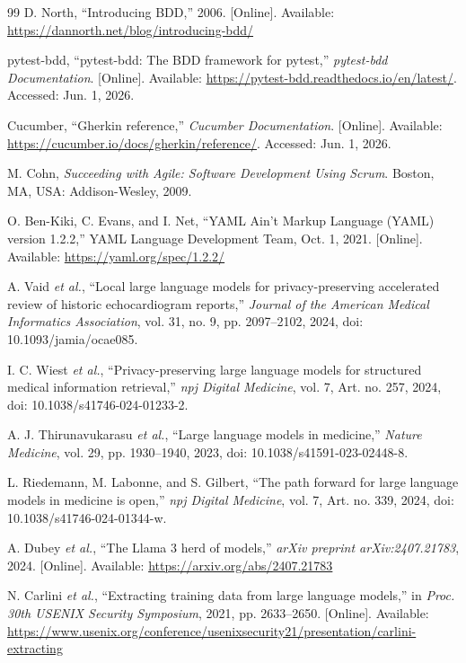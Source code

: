 \begin{thebibliography}{99}
D. North, ``Introducing BDD,'' 2006. [Online]. Available: \url{https://dannorth.net/blog/introducing-bdd/}

pytest-bdd, ``pytest-bdd: The BDD framework for pytest,'' \textit{pytest-bdd Documentation}. [Online]. Available: \url{https://pytest-bdd.readthedocs.io/en/latest/}. Accessed: Jun. 1, 2026.

Cucumber, ``Gherkin reference,'' \textit{Cucumber Documentation}. [Online]. Available: \url{https://cucumber.io/docs/gherkin/reference/}. Accessed: Jun. 1, 2026.

M. Cohn, \textit{Succeeding with Agile: Software Development Using Scrum}. Boston, MA, USA: Addison-Wesley, 2009.

O. Ben-Kiki, C. Evans, and I. Net, ``YAML Ain't Markup Language (YAML) version 1.2.2,'' YAML Language Development Team, Oct. 1, 2021. [Online]. Available: \url{https://yaml.org/spec/1.2.2/}

A. Vaid \textit{et al.}, ``Local large language models for privacy-preserving accelerated review of historic echocardiogram reports,'' \textit{Journal of the American Medical Informatics Association}, vol. 31, no. 9, pp. 2097--2102, 2024, doi: 10.1093/jamia/ocae085.

I. C. Wiest \textit{et al.}, ``Privacy-preserving large language models for structured medical information retrieval,'' \textit{npj Digital Medicine}, vol. 7, Art. no. 257, 2024, doi: 10.1038/s41746-024-01233-2.

A. J. Thirunavukarasu \textit{et al.}, ``Large language models in medicine,'' \textit{Nature Medicine}, vol. 29, pp. 1930--1940, 2023, doi: 10.1038/s41591-023-02448-8.

L. Riedemann, M. Labonne, and S. Gilbert, ``The path forward for large language models in medicine is open,'' \textit{npj Digital Medicine}, vol. 7, Art. no. 339, 2024, doi: 10.1038/s41746-024-01344-w.

A. Dubey \textit{et al.}, ``The Llama 3 herd of models,'' \textit{arXiv preprint arXiv:2407.21783}, 2024. [Online]. Available: \url{https://arxiv.org/abs/2407.21783}

N. Carlini \textit{et al.}, ``Extracting training data from large language models,'' in \textit{Proc. 30th USENIX Security Symposium}, 2021, pp. 2633--2650. [Online]. Available: \url{https://www.usenix.org/conference/usenixsecurity21/presentation/carlini-extracting}

\end{thebibliography}
